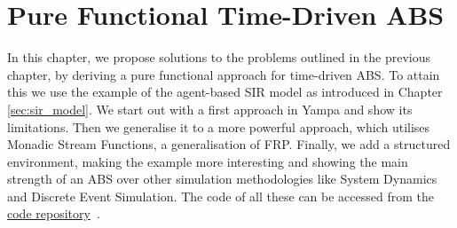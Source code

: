 \chapter{Pure Functional Time-Driven ABS}
\label{ch:timedriven}

In this chapter, we propose solutions to the problems outlined in the previous chapter, by deriving a pure functional approach for time-driven ABS. To attain this we use the example of the agent-based SIR model as introduced in Chapter \ref{sec:sir_model}. We start out with a first approach in Yampa and show its limitations. Then we generalise it to a more powerful approach, which utilises Monadic Stream Functions, a generalisation of FRP. Finally, we add a structured environment, making the example more interesting and showing the main strength of an ABS over other simulation methodologies like System Dynamics and Discrete Event Simulation. The code of all these can be accessed from the \href{https://github.com/thalerjonathan/haskell-sir}{code repository}~\cite{thaler_sir_repository}.







